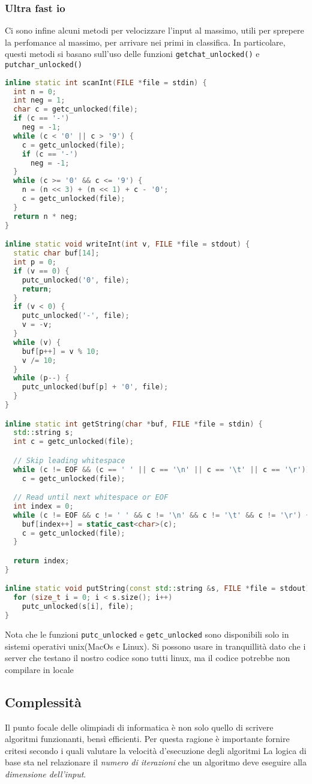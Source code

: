 \subsubsection{Ultra fast io}
Ci sono infine alcuni metodi per velocizzare l'input al massimo, utili per sprepere la perfomance al massimo, per arrivare nei primi in classifica. In particolare, questi metodi si basano sull'uso delle funzioni \verb|getchat_unlocked()| e \verb|putchar_unlocked()|
\begin{lstlisting}[language = cpp, frame = none]
inline static int scanInt(FILE *file = stdin) {
  int n = 0;
  int neg = 1;
  char c = getc_unlocked(file);
  if (c == '-')
    neg = -1;
  while (c < '0' || c > '9') {
    c = getc_unlocked(file);
    if (c == '-')
      neg = -1;
  }
  while (c >= '0' && c <= '9') {
    n = (n << 3) + (n << 1) + c - '0';
    c = getc_unlocked(file);
  }
  return n * neg;
}

inline static void writeInt(int v, FILE *file = stdout) {
  static char buf[14];
  int p = 0;
  if (v == 0) {
    putc_unlocked('0', file);
    return;
  }
  if (v < 0) {
    putc_unlocked('-', file);
    v = -v;
  }
  while (v) {
    buf[p++] = v % 10;
    v /= 10;
  }
  while (p--) {
    putc_unlocked(buf[p] + '0', file);
  }
}

inline static int getString(char *buf, FILE *file = stdin) {
  std::string s;
  int c = getc_unlocked(file);

  // Skip leading whitespace
  while (c != EOF && (c == ' ' || c == '\n' || c == '\t' || c == '\r'))
    c = getc_unlocked(file);

  // Read until next whitespace or EOF
  int index = 0;
  while (c != EOF && c != ' ' && c != '\n' && c != '\t' && c != '\r') {
    buf[index++] = static_cast<char>(c);
    c = getc_unlocked(file);
  }

  return index;
}

inline static void putString(const std::string &s, FILE *file = stdout) {
  for (size_t i = 0; i < s.size(); i++)
    putc_unlocked(s[i], file);
}
\end{lstlisting}
Nota che le funzioni \verb|putc_unlocked| e \verb|getc_unlocked| sono disponibili solo in sistemi operativi unix(MacOs e Linux). Si possono usare in tranquillità dato che i server che testano il nostro codice sono tutti linux, ma il codice potrebbe non compilare in locale

\subsection{Complessità}
Il punto focale delle olimpiadi di informatica è non solo quello di scrivere algoritmi funzionanti, bensì efficienti. Per questa ragione è importante fornire critesi secondo i quali valutare la velocità d'esecuzione degli algoritmi
\vskip3mm
La logica di base sta nel relazionare il \textit{numero di iterazioni} che un algoritmo deve eseguire alla \textit{dimensione dell'input}.

